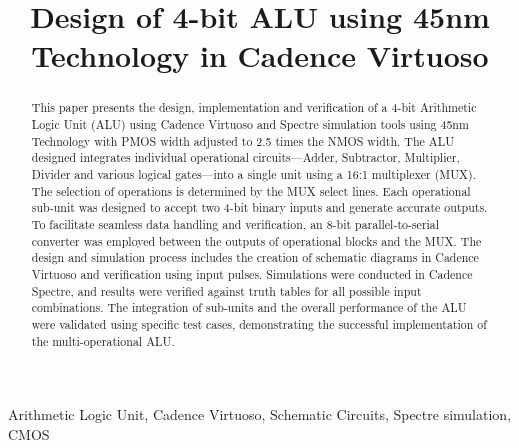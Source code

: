 \documentclass[conference]{IEEEtran}
\begin{document}
\title{Design of 4-bit ALU using 45nm Technology in Cadence Virtuoso\\}


\maketitle
\thispagestyle{plain}
\pagestyle{plain}

\begin{abstract}
This paper presents the design, implementation and verification of a 4-bit Arithmetic Logic Unit (ALU) using Cadence Virtuoso and Spectre simulation tools using 45nm Technology with PMOS width adjusted to 2.5 times the NMOS width. The ALU designed integrates individual operational circuits—Adder, Subtractor, Multiplier, Divider and various logical gates—into a single unit using a 16:1 multiplexer (MUX). The selection of operations is determined by the MUX select lines. Each operational sub-unit was designed to accept two 4-bit binary inputs and generate accurate outputs. To facilitate seamless data handling and verification, an 8-bit parallel-to-serial converter was employed between the outputs of operational blocks and the MUX. The design and simulation process includes the creation of schematic diagrams in  Cadence  Virtuoso and verification using input pulses. Simulations were conducted in Cadence Spectre, and results were verified against truth tables for all possible input combinations. The integration of sub-units and the overall performance of the ALU were validated using specific test cases, demonstrating the successful implementation of the multi-operational ALU.
\end{abstract}
\begin{IEEEkeywords}
Arithmetic Logic Unit, Cadence Virtuoso, Schematic Circuits, Spectre simulation, CMOS
\end{IEEEkeywords}
\end{document}
